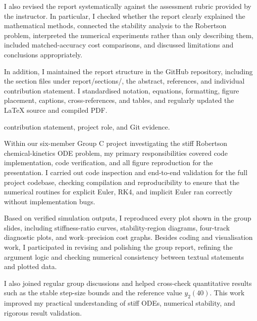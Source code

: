 \begin{description}[style=nextline,leftmargin=0pt]
I also revised the report systematically against the assessment rubric provided by the instructor. In particular, I checked whether the report clearly explained the mathematical methods, connected the stability analysis to the Robertson problem, interpreted the numerical experiments rather than only describing them, included matched-accuracy cost comparisons, and discussed limitations and conclusions appropriately.  

In addition, I maintained the report structure in the GitHub repository, including the section files under report/sections/, the abstract, references, and individual contribution statement. I standardised notation, equations, formatting, figure placement, captions, cross-references, and tables, and regularly updated the LaTeX source and compiled PDF.
\item[Member 5 -- Taiqi Zhang (2363684):] \pending{} contribution statement, project role, and Git evidence.
\item[Member 6 -- Yujia Ding (2362094):] Within our six-member Group C project investigating the stiff Robertson chemical-kinetics ODE problem, my primary responsibilities covered code implementation, code verification, and all figure reproduction for the presentation. I carried out code inspection and end-to-end validation for the full project codebase, checking compilation and reproducibility to ensure that the numerical routines for explicit Euler, RK4, and implicit Euler ran correctly without implementation bugs.

Based on verified simulation outputs, I reproduced every plot shown in the group slides, including stiffness-ratio curves, stability-region diagrams, four-track diagnostic plots, and work--precision cost graphs. Besides coding and visualisation work, I participated in revising and polishing the group report, refining the argument logic and checking numerical consistency between textual statements and plotted data.

I also joined regular group discussions and helped cross-check quantitative results such as the stable step-size bounds and the reference value $y_2(40)$. This work improved my practical understanding of stiff ODEs, numerical stability, and rigorous result validation.
\end{description}
